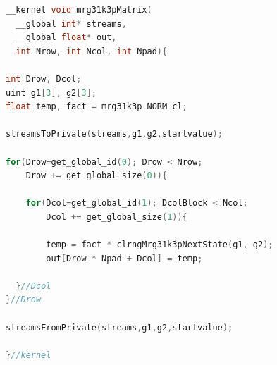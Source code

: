 \documentclass[article,nojss]{jss}\usepackage[]{graphicx}\usepackage[]{color}
\renewcommand{\subfloat}[2][need a sub-caption]{ \subcaptionbox{#1}{#2} }
\begin{document}
\begin{framed}
\begin{lstlisting}[language=C,basicstyle=\small,label={lst:uniformkernel}]
__kernel void mrg31k3pMatrix(
  __global int* streams,
  __global float* out,
  int Nrow, int Ncol, int Npad){

int Drow, Dcol;
uint g1[3], g2[3];
float temp, fact = mrg31k3p_NORM_cl;

streamsToPrivate(streams,g1,g2,startvalue);

for(Drow=get_global_id(0); Drow < Nrow;
    Drow += get_global_size(0)){

    for(Dcol=get_global_id(1); DcolBlock < Ncol; 
        Dcol += get_global_size(1)){

        temp = fact * clrngMrg31k3pNextState(g1, g2);
        out[Drow * Npad + Dcol] = temp;

  }//Dcol
}//Drow

streamsFromPrivate(streams,g1,g2,startvalue);

}//kernel
\end{lstlisting}
\end{framed}
\end{document}
